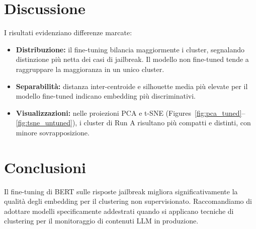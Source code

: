 \documentclass[a4paper,12pt]{article}
\begin{document}
\FloatBarrier

\section{Discussione}
I risultati evidenziano differenze marcate:
\begin{itemize}
  \item \textbf{Distribuzione:} il fine-tuning bilancia maggiormente i cluster, segnalando distinzione più netta dei casi di jailbreak. Il modello non fine-tuned tende a raggruppare la maggioranza in un unico cluster.
  \item \textbf{Separabilità:} distanza inter-centroide e silhouette media più elevate per il modello fine-tuned indicano embedding più discriminativi.
  \item \textbf{Visualizzazioni:} nelle proiezioni PCA e t-SNE (Figures~\ref{fig:pca_tuned}--\ref{fig:tsne_untuned}), i cluster di Run A risultano più compatti e distinti, con minore sovrapposizione.
\end{itemize}

\section{Conclusioni}
Il fine-tuning di BERT sulle risposte jailbreak migliora significativamente la qualità degli embedding per il clustering non supervisionato. Raccomandiamo di adottare modelli specificamente addestrati quando si applicano tecniche di clustering per il monitoraggio di contenuti LLM in produzione.
\end{document}
